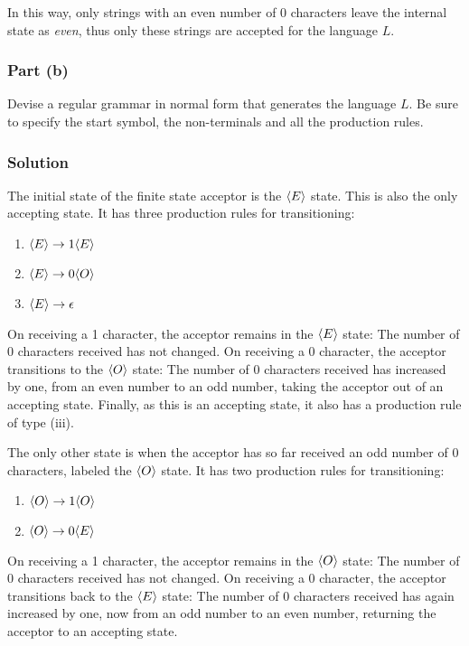 \documentclass[12pt]{article}
\def\<#1>{\langle\ignorespaces#1\unskip\rangle}
\begin{document}
In this way, only strings with an even number of 0 characters leave the internal state as \textit{even}, thus only these strings are accepted for the language $L$.

\subsubsection*{Part (b)}

Devise a regular grammar in normal form that generates the language $L$.
Be sure to specify the start symbol, the non-terminals and all the production rules.

\subsubsection*{Solution}

The initial state of the finite state acceptor is the $\<E>$ state.
This is also the only accepting state.
It has three production rules for transitioning:
\begin{enumerate}[label = (\arabic*)]
	\item $\<E> \rightarrow 1\<E>$
	\item $\<E> \rightarrow 0\<O>$
	\item $\<E> \rightarrow \epsilon$
\end{enumerate}
On receiving a 1 character, the acceptor remains in the $\<E>$ state: The number of 0 characters received has not changed.
On receiving a 0 character, the acceptor transitions to the $\<O>$ state: The number of 0 characters received has increased by one, from an even number to an odd number, taking the acceptor out of an accepting state.
Finally, as this is an accepting state, it also has a production rule of type (iii).

The only other state is when the acceptor has so far received an odd number of 0 characters, labeled the $\<O>$ state.
It has two production rules for transitioning:
\begin{enumerate}[label = (\arabic*), resume]
	\item $\<O> \rightarrow 1\<O>$
	\item $\<O> \rightarrow 0\<E>$
\end{enumerate}
On receiving a 1 character, the acceptor remains in the $\<O>$ state: The number of 0 characters received has not changed.
On receiving a 0 character, the acceptor transitions back to the $\<E>$ state: The number of 0 characters received has again increased by one, now from an odd number to an even number, returning the acceptor to an accepting state.
\end{document}
